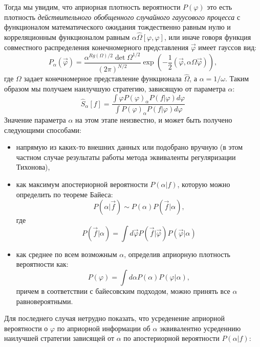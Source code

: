 Тогда мы увидим, что априорная плотность вероятности $P(\varphi)$ это есть плотность \textit{действительного обобщенного случайного гауусового процесса} с функционалом математического ожидания тождественно равным нулю и корреляционным функционалом равным $\alpha \hat{\Omega}[\varphi,\varphi]$, или иначе говоря функция совместного распределения конечномерного представления $\vec{\varphi}$ имеет гауссов вид:
\begin{equation}
P_{\alpha}(\vec{\varphi})  = \frac{\alpha^{Rg(\Omega)/2}\det\Omega^{1/2}}{(2\pi)^{N/2}} \exp(-\frac{1}{2} (\vec{\varphi},\alpha\Omega\vec{\varphi})),
\end{equation}
где $\Omega$ задает конечномерное представление функционала $\hat{\Omega}$, а $\alpha = 1/\omega$.
Таким образом мы получаем наилучшую стратегию, зависящую от параметра $\alpha$:
\begin{equation}
\hat{S}_{\alpha}[f] =  \frac{\int \varphi P(\varphi)_{\alpha}P(f|\varphi) d\varphi }{\int P(\varphi)_{\alpha}P(f|\varphi)d\varphi }
\label{eq:opt_alpha}
\end{equation}
Значение параметра $\alpha$ на этом этапе неизвестно, и может быть получено следующими способами:
\begin{itemize}
    \item напрямую из каких-то внешних данных или подобрано вручную (в этом частном случае результаты работы метода эквиваленты регуляризации Тихонова),
    \item как максимум апостериорной вероятности $P(\alpha|f)$, которую можно определить по теореме Байеса: \begin{equation}
    P(\alpha|\vec{f}) \sim P(\alpha)P(\vec{f}|\alpha),
    \end{equation}
    где
    \begin{equation}
    \label{eq:prob_f_alpha}
    P(\vec{f}|\alpha) = \int d\vec{\varphi} P(\vec{f}|\vec{\varphi})P(\vec{\varphi}|\alpha)
    \end{equation}
    \item как среднее по всем возможным $\alpha$, определив априорную плотность вероятности как:
    \begin{equation}
    P(\varphi) = \int d\alpha P(\alpha) P(\varphi|\alpha),
    \end{equation}
    причем в соответствии с байесовским подходом, можно принять все $\alpha$ равновероятными.
\end{itemize}
Для последнего случая нетрудно показать, что усреденение априорной вероятности о $\varphi$ по априорной информации об $\alpha$ эквивалентно усреденнию наилучшей стратегии зависящей от $\alpha$ по апостериорной вероятности $P(\alpha|f)$:
